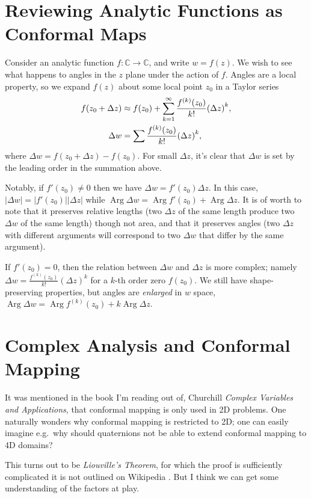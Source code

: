 \documentclass[12pt]{report}
\newcommand{\abs}[1]{\left|#1\right|}
\DeclareMathOperator{\Arg}{Arg}
\DeclarePairedDelimiter\p{\lparen}{\rparen}
\begin{document}
\section{Reviewing Analytic Functions as Conformal Maps}

Consider an analytic function $f: \mathbb{C} \to \mathbb{C}$, and write $w =
f(z)$. We wish to see what happens to angles in the $z$ plane under the action
of $f$. Angles are a local property, so we expand $f(z)$ about some local point
$z_0$ in a Taylor series
\begin{align}
    f(z_0 + \Delta z) &\approx f(z_0) + \sum\limits_{k=1}^\infty
        \frac{f^{(k)}(z_0)}{k!}\p*{\Delta z}^k,\\
    \Delta w &= \sum\limits \frac{f^{(k)}(z_0)}{k!}\p*{\Delta z}^k,
\end{align}
where $\Delta w = f(z_0 + \Delta z) - f(z_0)$. For small $\Delta z$, it's clear
that $\Delta w$ is set by the leading order in the summation above.

Notably, if $f'(z_0) \neq 0$ then we have $\Delta w = f'(z_0) \Delta z$. In this
case, $\abs{\Delta w} = \abs{f'(z_0)}\abs{\Delta z}$ while $\Arg \Delta w = \Arg
f'(z_0) + \Arg \Delta z$. It is of worth to note that it preserves relative
lengths (two $\Delta z$ of the same length produce two $\Delta w$ of the same
length) though not area, and that it preserves angles (two $\Delta z$ with
different arguments will correspond to two $\Delta w$ that differ by the same
argument).

If $f'(z_0) = 0$, then the relation between $\Delta w$ and $\Delta z$ is more
complex; namely $\Delta w = \frac{f^{(k)}(z_0)}{k!} (\Delta z)^k$ for a $k$-th order
zero $f(z_0)$. We still have shape-preserving properties, but angles are
\emph{enlarged} in $w$ space, $\Arg \Delta w = \Arg f^{(k)}(z_0) + k \Arg \Delta
z$.

\section{Complex Analysis and Conformal Mapping}

It was mentioned in the book I'm reading out of, Churchill \emph{Complex
Variables and Applications}, that conformal mapping is only used in 2D problems.
One naturally wonders why conformal mapping is restricted to 2D\@; one can
easily imagine e.g.\ why should quaternions not be able to extend conformal
mapping to 4D domains?

This turns out to be \emph{Liouville's Theorem}, for which the proof is
sufficiently complicated it is not outlined on Wikipedia \frownie. But I think
we can get some understanding of the factors at play.
\end{document}
